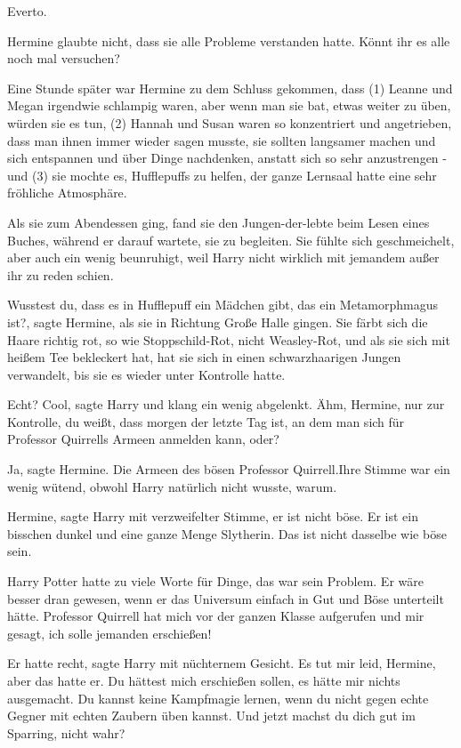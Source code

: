 \glqq{}Everto.\grqq{}

Hermine glaubte nicht, dass sie alle Probleme verstanden hatte. \glqq{}Könnt ihr
es alle noch mal versuchen?\grqq{}

Eine Stunde später war Hermine zu dem Schluss gekommen, dass (1) Leanne und
Megan irgendwie schlampig waren, aber wenn man sie bat, etwas weiter zu üben,
würden sie es tun, (2) Hannah und Susan waren so konzentriert und angetrieben,
dass man ihnen immer wieder sagen musste, sie sollten langsamer machen und sich
entspannen und über Dinge nachdenken, anstatt sich so sehr anzustrengen - und
(3) sie mochte es, Hufflepuffs zu helfen, der ganze Lernsaal hatte eine sehr
fröhliche Atmosphäre.

Als sie zum Abendessen ging, fand sie den Jungen-der-lebte beim Lesen eines
Buches, während er darauf wartete, sie zu begleiten. Sie fühlte sich
geschmeichelt, aber auch ein wenig beunruhigt, weil Harry nicht wirklich mit
jemandem außer ihr zu reden schien.

\glqq{}Wusstest du, dass es in Hufflepuff ein Mädchen gibt, das ein
Metamorphmagus ist?\grqq{}, sagte Hermine, als sie in Richtung Große Halle
gingen. \glqq{}Sie färbt sich die Haare richtig rot, so wie Stoppschild-Rot,
nicht Weasley-Rot, und als sie sich mit heißem Tee bekleckert hat, hat sie sich
in einen schwarzhaarigen Jungen verwandelt, bis sie es wieder unter Kontrolle
hatte.\grqq{}

\glqq{}Echt? Cool\grqq{}, sagte Harry und klang ein wenig abgelenkt. \glqq{}Ähm,
Hermine, nur zur Kontrolle, du weißt, dass morgen der letzte Tag ist, an dem man
sich für Professor Quirrells Armeen anmelden kann, oder?\grqq{}

\glqq{}Ja\grqq{}, sagte Hermine. \glqq{}Die Armeen des bösen Professor
Quirrell.\grqq{}Ihre Stimme war ein wenig wütend, obwohl Harry natürlich nicht
wusste, warum.

\glqq{}Hermine\grqq{}, sagte Harry mit verzweifelter Stimme, \glqq{}er ist nicht
böse. Er ist ein bisschen dunkel und eine ganze Menge Slytherin. Das ist nicht
dasselbe wie böse sein.\grqq{}

Harry Potter hatte zu viele Worte für Dinge, das war sein Problem. Er wäre
besser dran gewesen, wenn er das Universum einfach in Gut und Böse unterteilt
hätte. \glqq{}Professor Quirrell hat mich vor der ganzen Klasse aufgerufen und
mir gesagt, ich solle jemanden erschießen!\grqq{}

\glqq{}Er hatte recht\grqq{}, sagte Harry mit nüchternem Gesicht. \glqq{}Es tut
mir leid, Hermine, aber das hatte er. Du hättest mich erschießen sollen, es
hätte mir nichts ausgemacht. Du kannst keine Kampfmagie lernen, wenn du nicht
gegen echte Gegner mit echten Zaubern üben kannst. Und jetzt machst du dich gut
im Sparring, nicht wahr?\grqq{}

